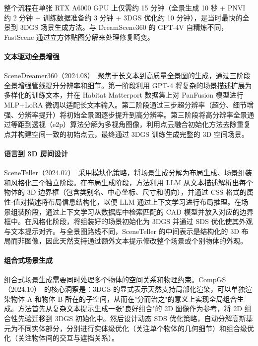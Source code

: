 整个流程在单张 RTX A6000 GPU 上仅需约 15 分钟（全景生成 10 秒 + PNVI 约 2 分钟 + 训练数据准备约 3 分钟 + 3DGS 优化约 10 分钟），是当时最快的全景到 3DGS 场景生成方法。与 DreamScene360 的 GPT-4V 自精炼不同，FastScene 通过立方体贴图分解来处理修复畸变。

\paragraph{文本驱动全景增强}

SceneDreamer360（2024.08）~\cite{2408_13711}聚焦于长文本到高质量全景图的生成，通过三阶段全景增强管线提升分辨率和细节。第一阶段利用 GPT-4 将复杂的场景描述扩展为多样化的训练文本，并在 Habitat Matterport 数据集上对 PanFusion 模型进行 MLP+LoRA 微调以适配长文本输入。第二阶段通过三步超分辨率（超分、细节增强、分辨率提升）将初始全景图逐步提升到高分辨率。第三阶段将高分辨率全景通过等距到透视（e2p）算法分解为多视角图像，利用点云融合初始化方法去除重复点并构建空间一致的初始点云，最终通过 3DGS 训练生成完整的 3D 空间场景。

\paragraph{语言到 3D 房间设计}

SceneTeller（2024.07）~\cite{2407_20727}采用模块化策略，将场景生成分解为布局生成、场景组装和风格化三个独立阶段。在布局生成阶段，方法利用 LLM 从文本描述解析出每个物体的 3D 边界框（包含类别名、中心坐标、尺寸和朝向），并通过 CSS 格式的属性-值对描述将布局信息结构化，以便 LLM 通过上下文学习进行布局推理。在场景组装阶段，通过上下文学习从数据库中检索匹配的 CAD 模型并放入对应的边界框中。在风格化阶段，将组装好的场景初始化为 3DGS 并通过 SDS 优化使其外观与文本提示对齐。与全景图路线不同，SceneTeller 的中间表示是结构化的 3D 布局而非图像，因此天然支持通过额外文本提示修改整个场景或个别物体的外观。

\paragraph{组合式场景生成}

组合式场景生成需要同时处理多个物体的空间关系和物理约束。CompGS（2024.10）~\cite{2410_20723}的核心洞察是：3DGS 的显式表示天然支持局部化渲染，可以单独渲染物体 A 和物体 B 所在的子空间，从而在"分而治之"的意义上实现全局组合生成。方法首先从复杂文本提示生成一张"良好组合"的 2D 图像作为参考，将 2D 组合性先验迁移到 3DGS 初始化中。然后设计动态 SDS 优化策略，自动分解高斯基元为不同实体部分，分别进行实体级优化（关注单个物体的几何细节）和组合级优化（关注物体间的交互与遮挡关系）。


